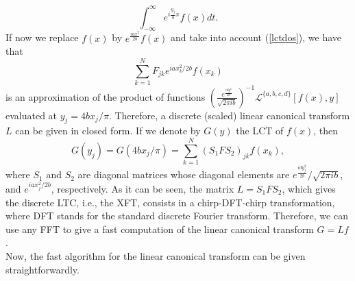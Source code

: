 \documentclass[12pt]{article}
\begin{document}
\[
\int_{-\infty}^\infty e^{i\frac{y_j}{b} x} f(x)dt.
\]
If now we replace $f(x)$ by $e^{\frac{iax^2}{2b}}f(x)$ and take into account (\ref{lctdos}), we have that 
\[
\sum_{k=1}^NF_{jk}e^{iax_k^2/2b}f(x_k)
\]
is an approximation of the product of functions $ \left(\frac{e^{\frac{idy^2}{2b}}}{\sqrt{2\pi i  b}}\right)^{-1}{\mathcal L}^{\{a,b,c,d\}}[f(x),y]$ evaluated at $y_j=4bx_j/\pi$.  Therefore, a discrete (scaled) linear canonical transform $L$ can be given in closed form. If we denote by $G(y)$ the LCT of $f(x)$, then
\[
G(y_j)=G(4bx_j/\pi)=\sum_{k=1}^N(S_1FS_2)_{jk}f(x_k),
\]
where $S_1$ and $S_2$ are diagonal matrices whose diagonal elements are $e^{\frac{idy_j^2}{2b}}/\sqrt{2\pi i  b}$, and $e^{iax_j^2/2b}$, respectively. As it can be seen, the matrix $L=S_1FS_2$, which gives the discrete LTC, i.e., the XFT, consists in a chirp-DFT-chirp transformation, where DFT stands for the standard discrete Fourier transform. Therefore, we can use any FFT to give a fast computation of the linear canonical transform $G=Lf$.\\
Now, the fast algorithm for the linear canonical transform can be given straightforwardly. 

\end{document}
